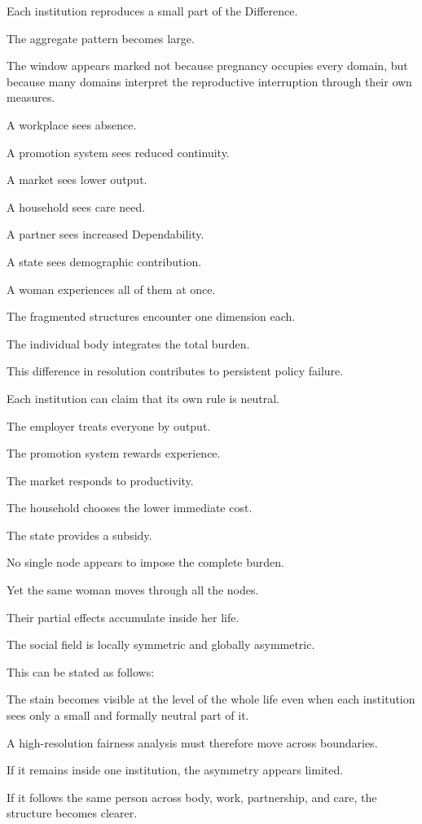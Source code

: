 Each institution reproduces a small part of the Difference.

The aggregate pattern becomes large.

The window appears marked not because pregnancy occupies every domain, but because many domains interpret the reproductive interruption through their own measures.

A workplace sees absence.

A promotion system sees reduced continuity.

A market sees lower output.

A household sees care need.

A partner sees increased Dependability.

A state sees demographic contribution.

A woman experiences all of them at once.

The fragmented structures encounter one dimension each.

The individual body integrates the total burden.

This difference in resolution contributes to persistent policy failure.

Each institution can claim that its own rule is neutral.

The employer treats everyone by output.

The promotion system rewards experience.

The market responds to productivity.

The household chooses the lower immediate cost.

The state provides a subsidy.

No single node appears to impose the complete burden.

Yet the same woman moves through all the nodes.

Their partial effects accumulate inside her life.

The social field is locally symmetric and globally asymmetric.

This can be stated as follows:

The stain becomes visible at the level of the whole life even when each institution sees only a small and formally neutral part of it.

A high-resolution fairness analysis must therefore move across boundaries.

If it remains inside one institution, the asymmetry appears limited.

If it follows the same person across body, work, partnership, and care, the structure becomes clearer.

